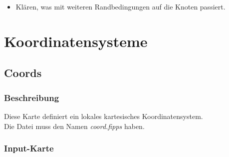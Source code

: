 \documentclass[11pt,titlepage,listof=totoc,bibliography=totoc,twoside]{scrreprt}
\begin{document}
{{\begin{itemize}
\item Klären, was mit weiteren Randbedingungen auf die Knoten passiert.
\end{itemize}

\newpage

\section{Koordinatensysteme}

\subsection{Coords}

\subsubsection{Beschreibung}

Diese Karte definiert ein lokales kartesisches Koordinatensystem.\\
Die Datei muss den Namen \emph{coord.fipps} haben.

\subsubsection{Input-Karte}

}}
\end{document}
